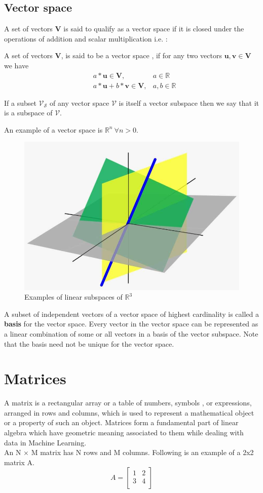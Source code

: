 \documentclass[12pt]{article}
\begin{document}
\subsection{Vector space}
A set of vectors \textbf{V} is said to qualify as a vector space if it is closed under the operations of addition and scalar multiplication i.e. :
\begin{definition}
A set of vectors $\mathbf{V}$, is said to be a vector space , if for any two vectors $\mathbf{u} , \mathbf{v} \in \mathbf{V}$ we have 
\begin{align}
   & a  *\mathbf{u} \in \mathbf{V} ,&a \in \mathbb{R}\\
    &a* \mathbf{u} + b*\mathbf{v} \in \mathbf{V} , &a,b \in \mathbb{R}
\end{align}
\end{definition}

\begin{definition}
If a subset $\mathcal{V_S}$ of any vector space $\mathcal{V}$ is itself a vector subspace then we say that it is a subspace of $\mathcal{V}$.
\end{definition}

An example of a vector space is $\mathbb{R}^n~  \forall n>0$.
\begin{figure}[h!]
\begin{center}
  \includegraphics[width=0.4\linewidth]{LinSub.jpg}
  \caption{Examples of linear subspaces of $\mathbb{R}^3$}
\end{center}
\end{figure}
A subset of independent vectors of a vector space of highest cardinality is called a \textbf{basis} for the vector space. Every vector in the vector space can be represented as a linear combination of some or all vectors in a basis of the vector subspace. Note that the basis need not be unique for the vector space.

\section{Matrices}
A matrix is a rectangular array or a table of numbers, symbols , or expressions, arranged in rows and columns, which is used to represent a mathematical object or a property of such an object. Matrices form a fundamental part of linear algebra which have geometric meaning associated to them while dealing with data in Machine Learning. \\
An N $\times$ M matrix has N rows and M columns. Following is an example of a 2x2 matrix A.
$$ A = 
\begin{bmatrix}
1 & 2 \\
3 & 4 \\
\end{bmatrix}
$$
\end{document}
